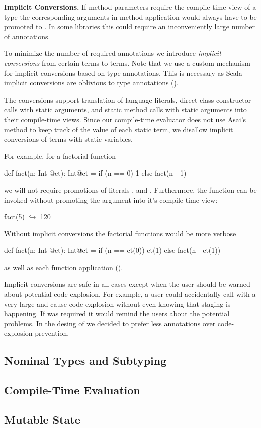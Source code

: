{\bf Implicit Conversions.} If method parameters require the compile-time view of a type the corresponding arguments
 in method application would always have to be promoted to .
 In some libraries this could require an inconveniently large number of annotations.

To minimize the number of required annotations we introduce \emph{implicit conversions}
 from certain  terms to  terms. Note that we use a custom mechanism for
 implicit conversions based on type annotations. This is necessary as Scala implicit conversions
 are oblivious to type annotations ().

The conversions support translation of language literals, direct class constructor calls with static arguments, and static method
 calls with static arguments into their compile-time views. Since our compile-time evaluator does
 not use Asai's~\cite{asai2002binding,sumii2001hybrid} method to keep track of
 the value of each static term, we disallow implicit conversions of terms with static variables.

For example, for a factorial function \begin{lstparagraph}
def fact(n: Int @ct): Int@ct =
  if (n == 0) 1 else fact(n - 1)
 \end{lstparagraph} we will not require promotions of literals , and . Furthermore,
 the function can be invoked without promoting the argument into it's compile-time view:\begin{lstparagraph}
fact(5)
  $\hookrightarrow$ 120
 \end{lstparagraph}

Without implicit conversions the factorial functions would be more verbose \begin{lstparagraph}
def fact(n: Int @ct): Int@ct =
  if (n == ct(0)) ct(1) else fact(n - ct(1))
 \end{lstparagraph} as well as each function application ().

Implicit conversions are safe in all cases except when the user should be warned about potential
code explosion. For example, a user could accidentally call  with a very large and
cause code explosion without even knowing that staging is happening. If  was required
it would remind the users about the potential problems. In the desing of \tool we decided to
prefer less annotations over code-explosion prevention.

\subsection{Nominal Types and Subtyping}
\label{sct:nominal-types}

\subsection{Compile-Time Evaluation}
\label{sct:evaluation}

\subsection{Mutable State}
\label{sct:mutable-state}
